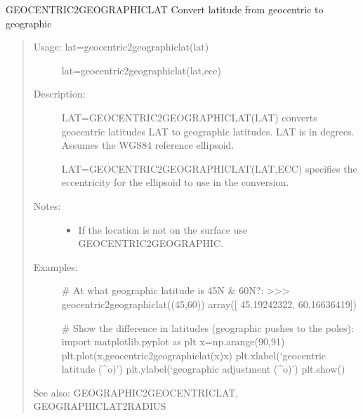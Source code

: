 \documentclass[letterpaper,10pt,english]{sphinxmanual}
\begin{document}
\begin{fulllineitems}
\label{\detokenize{infrapy.utils:infrapy.utils.latlon.geocentric2geographiclat}}
GEOCENTRIC2GEOGRAPHICLAT    Convert latitude from geocentric to geographic
\begin{quote}
\begin{description}
\item[{Usage:    lat=geocentric2geographiclat(lat)}] \leavevmode
lat=geocentric2geographiclat(lat,ecc)

\item[{Description:}] \leavevmode
LAT=GEOCENTRIC2GEOGRAPHICLAT(LAT) converts geocentric latitudes LAT to
geographic latitudes.  LAT is in degrees.  Assumes the WGS\sphinxhyphen{}84 reference
ellipsoid.

LAT=GEOCENTRIC2GEOGRAPHICLAT(LAT,ECC) specifies the eccentricity for
the ellipsoid to use in the conversion.

\item[{Notes:}] \leavevmode\begin{itemize}
\item {} 
If the location is not on the surface use GEOCENTRIC2GEOGRAPHIC.

\end{itemize}

\item[{Examples:}] \leavevmode
\# At what geographic latitude is 45N \& 60N?:
\textgreater{}\textgreater{}\textgreater{} geocentric2geographiclat((45,60))
array({[} 45.19242322,  60.16636419{]})

\# Show the difference in latitudes (geographic pushes to the poles):
import matplotlib.pyplot as plt
x=np.arange(\sphinxhyphen{}90,91)
plt.plot(x,geocentric2geographiclat(x)\sphinxhyphen{}x)
plt.xlabel(‘geocentric latitude (\textasciicircum{}o)’)
plt.ylabel(‘geographic adjustment (\textasciicircum{}o)’)
plt.show()

\end{description}

See also: GEOGRAPHIC2GEOCENTRICLAT, GEOGRAPHICLAT2RADIUS
\end{quote}

\end{fulllineitems}

\end{document}
